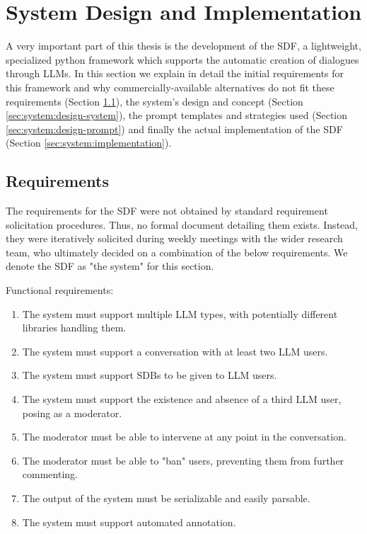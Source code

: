 %
\chapter{System Design and Implementation}
\label{sec:system}

A very important part of this thesis is the development of the \ac{SDF}, a lightweight, specialized python framework which supports the automatic creation of dialogues through LLMs. In this section we explain in detail the initial requirements for this framework and why commercially-available alternatives do not fit these requirements (Section \ref{sec:system:requirements}), the system's design and concept (Section \ref{sec:system:design-system}), the prompt templates and strategies used (Section \ref{sec:system:design-prompt}) and finally the actual implementation of the \ac{SDF} (Section \ref{sec:system:implementation}).

\section{Requirements}
\label{sec:system:requirements}

The requirements for the \ac{SDF} were not obtained by standard requirement solicitation procedures.  Thus, no formal document detailing them exists. Instead, they were iteratively solicited during weekly meetings with the wider research team, who ultimately decided on a combination of the below requirements. We denote the \ac{SDF} as "the system" for this section.

Functional requirements:
\begin{enumerate}
	\item The system must support multiple LLM types, with potentially different libraries handling them.
	\item The system must support a conversation with at least two LLM users.
	\item The system must support \acp{SDB} to be given to LLM users.
	\item The system must support the existence and absence of a third LLM user, posing as a moderator.
	\item The moderator must be able to intervene at any point in the conversation.
	\item The moderator must be able to "ban" users, preventing them from further commenting.
	\item The output of the system must be serializable and easily parsable.
	\item The system must support automated annotation.
\end{enumerate}

